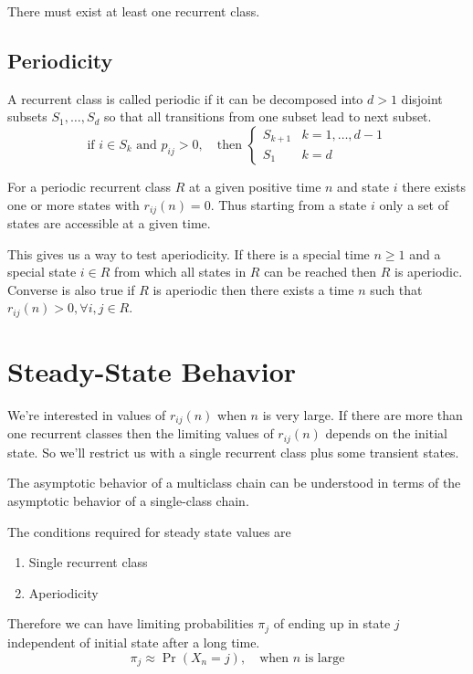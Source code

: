 There must exist at least one recurrent class.

\subsection{Periodicity}
A recurrent class is called periodic if it can be decomposed into $d>1$ disjoint subsets $S_1,\ldots,S_d$ so that all transitions from one subset lead to next subset.
\[\text{if } i\in S_k \text{ and } p_{ij}>0, \quad \text{then } \begin{cases}
    S_{k+1} & k=1,\ldots, d-1 \\
    S_1 & k=d
\end{cases}\]

For a periodic recurrent class $R$ at a given positive time $n$ and state $i$ there exists one or more states with $r_{ij}(n)=0$. Thus starting from a state $i$ only a set of states are accessible at a given time. 

This gives us a way to test aperiodicity. If there is a special time $n\ge 1$ and a special state $i\in R$ from which all states in $R$ can be reached then $R$ is aperiodic. Converse is also true if $R$ is aperiodic then there exists a time $n$ such that $r_{ij}(n)>0, \forall i,j \in R$.

\section{Steady-State Behavior}
We're interested in values of $r_{ij}(n)$ when $n$ is very large. If there are more than one recurrent classes then the limiting values of $r_{ij}(n)$ depends on the initial state. So we'll restrict us with a single recurrent class plus some transient states.
\begin{remark}
    The asymptotic behavior of a multiclass chain can be understood in terms of the asymptotic behavior of a single-class chain.
\end{remark}
The conditions required for steady state values are
\begin{enumerate}
    \item Single recurrent class
    \item Aperiodicity
\end{enumerate}
Therefore we can have limiting probabilities $\pi_j$ of ending up in state $j$ independent of initial state after a long time.
\[\pi_j\approx \Pr(X_n=j), \quad \text{when } n \text{ is large}\]

